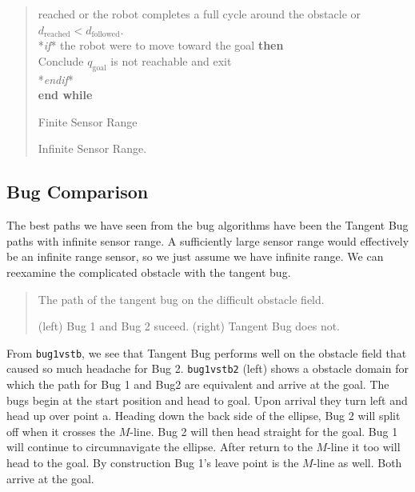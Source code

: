 \begin{quote}
reached or the robot completes a full cycle around the obstacle or
\(d_\text{reached} < d_\text{followed}\).\\
\hspace*{0.333em}\hspace*{0.333em}*\emph{if}* the robot were to move
toward the goal \textbf{then}\\
\hspace*{0.333em}\hspace*{0.333em}\hspace*{0.333em}\hspace*{0.333em}Conclude
\(q_{\text{goal}}\) is not reachable and exit\\
\hspace*{0.333em}\hspace*{0.333em}*\emph{endif}*\\
\textbf{end while}

Finite Sensor Range

Infinite Sensor Range.
\end{quote}

\hypertarget{bug-comparison}{%
\subsection{Bug Comparison}\label{bug-comparison}}

The best paths we have seen from the bug algorithms have been the
Tangent Bug paths with infinite sensor range. A sufficiently large
sensor range would effectively be an infinite range sensor, so we just
assume we have infinite range. We can reexamine the complicated obstacle
with the tangent bug.

\begin{quote}
The path of the tangent bug on the difficult obstacle field.

(left) Bug 1 and Bug 2 suceed. (right) Tangent Bug does not.
\end{quote}

From \texttt{bug1vstb}, we see that Tangent Bug performs well on the
obstacle field that caused so much headache for Bug 2.
\texttt{bug1vstb2} (left) shows a obstacle domain for which the path for
Bug 1 and Bug2 are equivalent and arrive at the goal. The bugs begin at
the start position and head to goal. Upon arrival they turn left and
head up over point a. Heading down the back side of the ellipse, Bug 2
will split off when it crosses the \(M\)-line. Bug 2 will then head
straight for the goal. Bug 1 will continue to circumnavigate the
ellipse. After return to the \(M\)-line it too will head to the goal. By
construction Bug 1's leave point is the \(M\)-line as well. Both arrive
at the goal.

